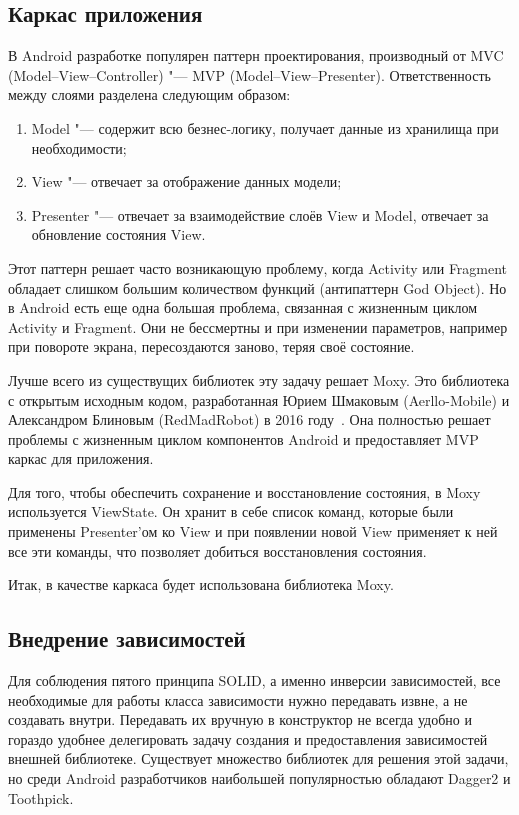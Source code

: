 \subsection{Каркас приложения}
\label{subsec:mvp}
В Android разработке популярен паттерн проектирования, производный от MVC (Model--View--Controller) "--- MVP (Model--View--Presenter).
Ответственность между слоями разделена следующим образом:
\begin{enumerate}
  \item Model "--- содержит всю безнес-логику, получает данные из хранилища при необходимости;
  \item View "--- отвечает за отображение данных модели;
  \item Presenter "--- отвечает за взаимодействие слоёв View и Model, отвечает за обновление состояния View.
\end{enumerate}

Этот паттерн решает часто возникающую проблему, когда Activity или Fragment обладает слишком большим количеством функций (антипаттерн God Object).
Но в Android есть еще одна большая проблема, связанная с жизненным циклом Activity и Fragment.
Они не бессмертны и при изменении параметров, например при повороте экрана, пересоздаются заново, теряя своё состояние.

Лучше всего из существущих библиотек эту задачу решает Moxy.
Это библиотека с открытым исходным кодом, разработанная Юрием Шмаковым (Aerllo-Mobile) и Александром Блиновым (RedMadRobot) в 2016 году~\cite{github:moxy}.
Она полностью решает проблемы с жизненным циклом компонентов Android и предоставляет MVP каркас для приложения.


Для того, чтобы обеспечить сохранение и восстановление состояния, в Moxy используется ViewState.
Он хранит в себе список команд, которые были применены Presenter'ом ко View и при появлении новой View применяет к ней все эти команды, что позволяет добиться восстановления состояния.

Итак, в качестве каркаса будет использована библиотека Moxy.

\subsection{Внедрение зависимостей}
\label{subsec:di}
Для соблюдения пятого принципа SOLID, а именно инверсии зависимостей, все необходимые для работы класса зависимости нужно передавать извне, а не создавать внутри.
Передавать их вручную в конструктор не всегда удобно и гораздо удобнее делегировать задачу создания и предоставления зависимостей внешней библиотеке.
Существует множество библиотек для решения этой задачи, но среди Android разработчиков наибольшей популярностью обладают Dagger2 и Toothpick.

